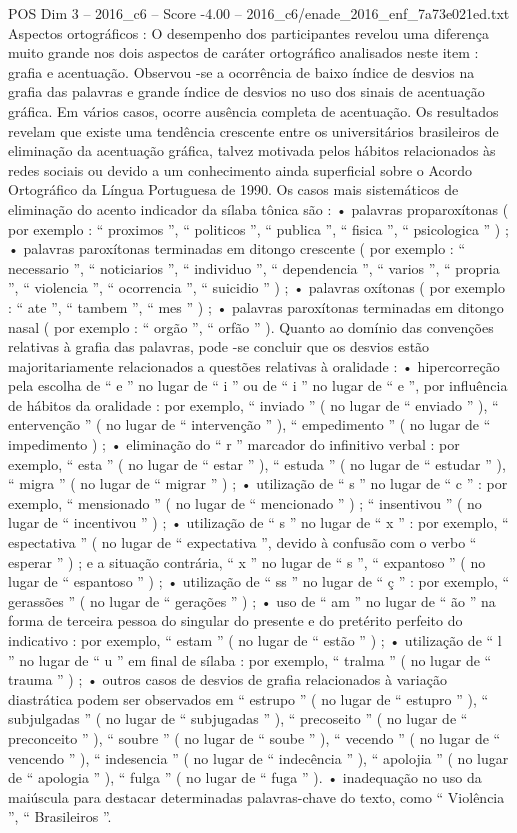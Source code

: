 \begin{textsample}{POS Dim 3 – 2016\_c6 – Score -4.00 – 2016\_c6/enade\_2016\_enf\_7a73e021ed.txt}
Aspectos ortográficos : O desempenho dos participantes revelou uma diferença muito grande nos dois aspectos de caráter ortográfico analisados neste item : grafia e acentuação.
Observou -se a ocorrência de baixo índice de desvios na grafia das palavras e grande índice de desvios no uso dos sinais de acentuação gráfica.
Em vários casos, ocorre ausência completa de acentuação.
Os resultados revelam que existe uma tendência crescente entre os universitários brasileiros de eliminação da acentuação gráfica, talvez motivada pelos hábitos relacionados às redes sociais ou devido a um conhecimento ainda superficial sobre o Acordo Ortográfico da Língua Portuguesa de 1990.
Os casos mais sistemáticos de eliminação do acento indicador da sílaba tônica são : • palavras proparoxítonas ( por exemplo : “ proximos ”, “ politicos ”, “ publica ”, “ fisica ”, “ psicologica ” ) ; • palavras paroxítonas terminadas em ditongo crescente ( por exemplo : “ necessario ”, “ noticiarios ”, “ individuo ”, “ dependencia ”, “ varios ”, “ propria ”, “ violencia ”, “ ocorrencia ”, “ suicidio ” ) ; • palavras oxítonas ( por exemplo : “ ate ”, “ tambem ”, “ mes ” ) ; • palavras paroxítonas terminadas em ditongo nasal ( por exemplo : “ orgão ”, “ orfão ” ).
Quanto ao domínio das convenções relativas à grafia das palavras, pode -se concluir que os desvios estão majoritariamente relacionados a questões relativas à oralidade : • hipercorreção pela escolha de “ e ” no lugar de “ i ” ou de “ i ” no lugar de “ e ”, por influência de hábitos da oralidade : por exemplo, “ inviado ” ( no lugar de “ enviado ” ), “ entervenção ” ( no lugar de “ intervenção ” ), “ empedimento ” ( no lugar de “ impedimento ) ; • eliminação do “ r ” marcador do infinitivo verbal : por exemplo, “ esta ” ( no lugar de “ estar ” ), “ estuda ” ( no lugar de “ estudar ” ), “ migra ” ( no lugar de “ migrar ” ) ; • utilização de “ s ” no lugar de “ c ” : por exemplo, “ mensionado ” ( no lugar de “ mencionado ” ) ; “ insentivou ” ( no lugar de “ incentivou ” ) ; • utilização de “ s ” no lugar de “ x ” : por exemplo, “ espectativa ” ( no lugar de “ expectativa ”, devido à confusão com o verbo “ esperar ” ) ; e a situação contrária, “ x ” no lugar de “ s ”, “ expantoso ” ( no lugar de “ espantoso ” ) ; • utilização de “ ss ” no lugar de “ ç ” : por exemplo, “ gerassões ” ( no lugar de “ gerações ” ) ; • uso de “ am ” no lugar de “ ão ” na forma de terceira pessoa do singular do presente e do pretérito perfeito do indicativo : por exemplo, “ estam ” ( no lugar de “ estão ” ) ; • utilização de “ l ” no lugar de “ u ” em final de sílaba : por exemplo, “ tralma ” ( no lugar de “ trauma ” ) ; • outros casos de desvios de grafia relacionados à variação diastrática podem ser observados em “ estrupo ” ( no lugar de “ estupro ” ), “ subjulgadas ” ( no lugar de “ subjugadas ” ), “ precoseito ” ( no lugar de “ preconceito ” ), “ soubre ” ( no lugar de “ soube ” ), “ vecendo ” ( no lugar de “ vencendo ” ), “ indesencia ” ( no lugar de “ indecência ” ), “ apolojia ” ( no lugar de “ apologia ” ), “ fulga ” ( no lugar de “ fuga ” ). • inadequação no uso da maiúscula para destacar determinadas palavras-chave do texto, como “ Violência ”, “ Brasileiros ”.

\end{textsample}
